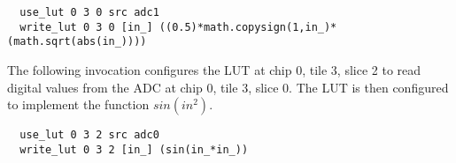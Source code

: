 \begin{lstlisting}
  use_lut 0 3 0 src adc1
  write_lut 0 3 0 [in_] ((0.5)*math.copysign(1,in_)*(math.sqrt(abs(in_))))
\end{lstlisting}

The following invocation configures the LUT at chip 0, tile 3, slice 2 to read
digital values from the ADC at chip 0, tile 3, slice 0. The LUT is then
configured to implement the function $sin(in^2)$. 
\begin{lstlisting}
  use_lut 0 3 2 src adc0
  write_lut 0 3 2 [in_] (sin(in_*in_))
\end{lstlisting}


